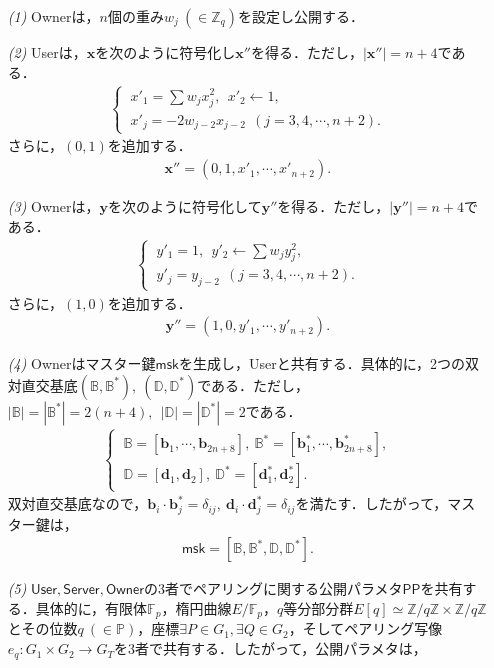 \documentclass[a4paper]{jsarticle}
\newcommand{\user}{\textsf{User}}
\newcommand{\owner}{\textsf{Owner}}
\begin{document}
\begin{enumerate}
\item[\it{(1)}] \owner は，$n$個の重み$w_j\ (\in \mathbb{Z}_q)$を設定し公開する．
\item[\it{(2)}] \user は，$\bm{x}$を次のように符号化し$\bm{x}''$を得る．ただし，$|\bm{x}''| = n + 4$である．
\begin{align}
\begin{cases}
\ x'_1 = \sum w_jx_j^2,\ \ x'_2\leftarrow 1, \\
\ x'_j= -2w_{j-2}x_{j-2}\ \ (j = 3,4,\cdots,n+2).
\end{cases}
\end{align}
さらに，$(0,1)$を追加する．
\begin{align}
\bm{x}'' = (0,1,x'_1,\cdots, x'_{n+2}).
\end{align}
\item[\it{(3)}] \owner は，$\bm{y}$を次のように符号化して$\bm{y}''$を得る．ただし，$|\bm{y}''| = n + 4$である．
\begin{align}
\begin{cases}
\ y'_1 = 1 ,\ \ y'_2\leftarrow \sum w_jy^2_j, \\
\ y'_j= y_{j-2}\ \ (j = 3,4,\cdots,n+2).
\end{cases}
\end{align}
さらに，$(1,0)$を追加する．
\begin{align}
\bm{y}'' = (1,0,y'_1,\cdots, y'_{n+2}).
\end{align}
\item[\it{(4)}] \owner はマスター鍵$\mathsf{msk}$を生成し，\user と共有する．具体的に，2つの双対直交基底$(\mathbb{B},\mathbb{B}^*),\ (\mathbb{D},\mathbb{D}^*)$である．ただし，$|\mathbb{B}| = |\mathbb{B}^*| = 2(n+4),\ \ |\mathbb{D}| = |\mathbb{D}^*| = 2$である．
\begin{align}
\begin{cases}
\ \mathbb{B} = [\bm{b}_1, \cdots, \bm{b}_{2n+8}],\ 
\mathbb{B}^* = [\bm{b}_1^*, \cdots, \bm{b}^*_{2n+8}],\\ 
\ \mathbb{D}=[\bm{d}_1,\bm{d}_2],\ 
\mathbb{D}^*=[\bm{d}_1^*,\bm{d}^*_2].
\end{cases}
\end{align}
双対直交基底なので，$\bm{b}_i\cdot \bm{b}_j^* = \delta_{ij},\ \bm{d}_i\cdot \bm{d}_j^* = \delta_{ij}$を満たす．したがって，マスター鍵は，
\begin{align}
\mathsf{msk} = [\mathbb{B},\mathbb{B}^*,\mathbb{D},\mathbb{D}^*].
\end{align}
\item[\it{(5)}] $\mathsf{User},\mathsf{Server},\mathsf{Owner}$の3者でペアリングに関する公開パラメタ$\mathsf{PP}$を共有する．具体的に，有限体$\mathbb{F}_p$，楕円曲線$E/\mathbb{F}_p$，$q$等分部分群$E[q]\simeq \mathbb{Z}/q\mathbb{Z}\times \mathbb{Z}/q\mathbb{Z}$とその位数$q\ (\in \mathbb{P})$，座標$\exists P\in G_1,\exists Q\in G_2$，そしてペアリング写像$e_q:G_1\times G_2 \rightarrow G_T$を3者で共有する．したがって，公開パラメタは，

\end{enumerate}
\end{document}

